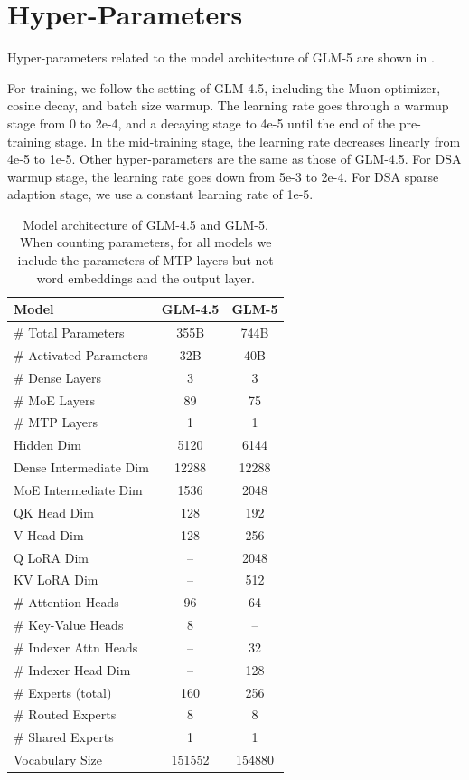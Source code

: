 \appendix

\section{Hyper-Parameters}

Hyper-parameters related to the model architecture of GLM-5 are shown in .

For training, we follow the setting of GLM-4.5, including the Muon optimizer, cosine decay, and batch size warmup. The learning rate goes through a warmup stage from 0 to 2e-4, and a decaying stage to 4e-5 until the end of the pre-training stage. In the mid-training stage, the learning rate decreases linearly from 4e-5 to 1e-5. Other hyper-parameters are the same as those of GLM-4.5. For DSA warmup stage, the learning rate goes down from 5e-3 to 2e-4. For DSA sparse adaption stage, we use a constant learning rate of 1e-5.

\begin{table}[!ht]
    \centering
    \caption{Model architecture of GLM-4.5 and GLM-5. When counting parameters, for all models we include the parameters of MTP layers but not word embeddings and the output layer.}
    \label{tab:model_arch_glm45_glm5}
    \begin{tabular}{l|cc}
    \toprule
       Model & \textbf{GLM-4.5} & \textbf{GLM-5} \\
    \midrule
       \# Total Parameters & 355B & 744B \\
       \# Activated Parameters & 32B & 40B \\
       \# Dense Layers & 3 & 3 \\
       \# MoE Layers & 89 & 75 \\
       \# MTP Layers & 1 & 1 \\
       Hidden Dim & 5120 & 6144 \\
       Dense Intermediate Dim & 12288 & 12288 \\
       MoE Intermediate Dim & 1536 & 2048 \\
    \midrule
       QK Head Dim & 128 & 192 \\
       V Head Dim & 128 & 256 \\
       Q LoRA Dim & -- & 2048 \\
       KV LoRA Dim & -- & 512 \\
       \# Attention Heads & 96 & 64 \\
       \# Key-Value Heads & 8 & -- \\
       \# Indexer Attn Heads & -- & 32 \\
       \# Indexer Head Dim & -- & 128 \\
    \midrule
       \# Experts (total) & 160 & 256 \\
       \# Routed Experts & 8 & 8 \\
       \# Shared Experts & 1 & 1 \\
    \midrule
       Vocabulary Size & 151552 & 154880 \\
    \bottomrule
    \end{tabular}
\end{table}

